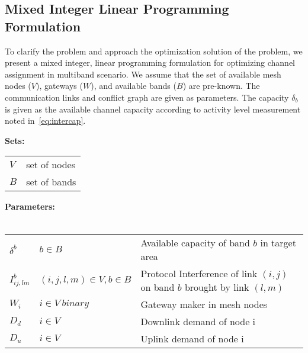 \subsection{Mixed Integer Linear Programming Formulation}
\label{subsec:linearopt}

To clarify the problem and approach the optimization solution of the 
problem, we present a mixed integer, linear programming 
formulation for optimizing channel assignment in multiband
scenario. We assume that the set of available mesh nodes 
($V$), gateways ($W$), and available bands ($B$) are pre-known. 
The communication links and conflict graph are given as parameters.
The capacity $\delta_b$ is given as the available channel capacity
according to activity level measurement noted in~\ref{eq:intercap}. 

\noindent
{\bf Sets:}
\begin{tabular}{ll}
$V$ & set of nodes \\
$B$ & set of bands \\
\end{tabular}

\noindent
{\bf Parameters:}\\
\\
\begin{tabular}{llp{3.4cm}}
$\delta^b$ & $b \in B$ & Available capacity of band $b$ in target area\\
$I_{ij,lm}^b$ & $(i,j,l,m) \in V, b\in B $ & Protocol Interference of link $(i,j)$ on band $b$ brought by link $(l,m)$\\
$W_i$ & $i \in V\ binary$ & Gateway maker in mesh nodes\\
$D_{d}$ & $i \in V\ $ & Downlink demand of node i\\
$D_{u}$ & $i \in V\ $ & Uplink demand of node i\\
\end{tabular}

